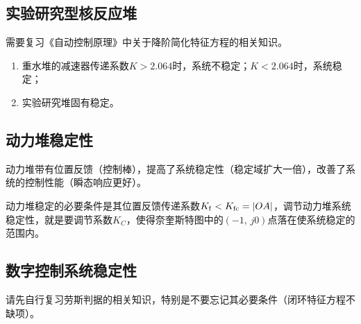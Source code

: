 \subsection{实验研究型核反应堆}

需要复习《自动控制原理》中关于降阶简化特征方程的相关知识。

\begin{enumerate}
    \item 重水堆的减速器传递系数$K > 2.064$时，系统不稳定；$K < 2.064$时，系统稳定；
    \item 实验研究堆固有稳定。
\end{enumerate}

\subsection{动力堆稳定性}

动力堆带有位置反馈（控制棒），提高了系统稳定性（稳定域扩大一倍），改善了系统的控制性能（瞬态响应更好）。

动力堆稳定的必要条件是其位置反馈传递系数$K_{\rm f} < K_{\rm fc} = |OA|$，调节动力堆系统稳定性，就是要调节系数$K_C$，使得奈奎斯特图中的$(-1,\,j0)$点落在使系统稳定的范围内。

\subsection{数字控制系统稳定性}

请先自行复习劳斯判据的相关知识，特别是不要忘记其必要条件（闭环特征方程不缺项）。

